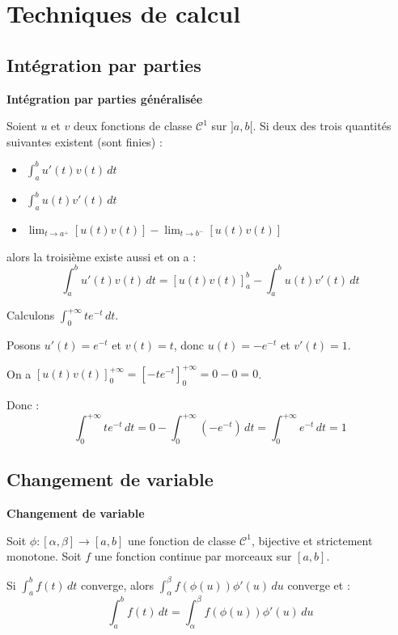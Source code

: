 \documentclass[../PolyS4.tex]{subfiles}
\begin{document}
\section{Techniques de calcul}

\subsection{Intégration par parties}

\begin{Thm}
\textbf{Intégration par parties généralisée}

Soient $u$ et $v$ deux fonctions de classe $\mathcal{C}^1$ sur $]a, b[$. Si deux des trois quantités suivantes existent (sont finies) :
\begin{itemize}
\item $\displaystyle\int_{a}^{b} u'(t) v(t) \, dt$
\item $\displaystyle\int_{a}^{b} u(t) v'(t) \, dt$
\item $\displaystyle\lim_{t \to a^{+}} [u(t)v(t)] - \lim_{t \to b^{-}} [u(t)v(t)]$
\end{itemize}
alors la troisième existe aussi et on a :
$$\int_{a}^{b} u'(t) v(t) \, dt = \left[u(t)v(t)\right]_{a}^{b} - \int_{a}^{b} u(t) v'(t) \, dt$$
\end{Thm}

\begin{Ex}
Calculons $\displaystyle\int_{0}^{+\infty} t e^{-t} \, dt$.

Posons $u'(t) = e^{-t}$ et $v(t) = t$, donc $u(t) = -e^{-t}$ et $v'(t) = 1$.

On a $[u(t)v(t)]_{0}^{+\infty} = \left[-te^{-t}\right]_{0}^{+\infty} = 0 - 0 = 0$.

Donc :
$$\int_{0}^{+\infty} t e^{-t} \, dt = 0 - \int_{0}^{+\infty} (-e^{-t}) \, dt = \int_{0}^{+\infty} e^{-t} \, dt = 1$$
\end{Ex}

\subsection{Changement de variable}

\begin{Thm}
\textbf{Changement de variable}

Soit $\phi : [\alpha, \beta] \to [a, b]$ une fonction de classe $\mathcal{C}^1$, bijective et strictement monotone. Soit $f$ une fonction continue par morceaux sur $[a, b]$.

Si $\displaystyle\int_{a}^{b} f(t) \, dt$ converge, alors $\displaystyle\int_{\alpha}^{\beta} f(\phi(u)) \phi'(u) \, du$ converge et :
$$\int_{a}^{b} f(t) \, dt = \int_{\alpha}^{\beta} f(\phi(u)) \phi'(u) \, du$$
\end{Thm}
\end{document}
